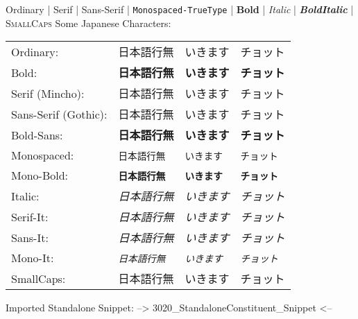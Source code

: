 Ordinary | \textrm{Serif} | \textsf{Sans-Serif} | \texttt{Monospaced-TrueType} | \textbf{Bold} | \textit{Italic} | \textit{\textbf{BoldItalic}} | \textsc{SmallCaps}\nl%
Some Japanese Characters:\nl%
\begin{tabular}{llll}%
Ordinary:&日本語行無&いきます&チョット\\%
Bold:&\textbf{日本語行無}&\textbf{いきます}&\textbf{チョット}\\%
Serif (Mincho):&\textrm{日本語行無}&\textrm{いきます}&\textrm{チョット}\\%
Sans-Serif (Gothic):&\textsf{日本語行無}&\textsf{いきます}&\textsf{チョット}\\%
Bold-Sans:&\textbf{\textsf{日本語行無}}&\textbf{\textsf{いきます}}&\textbf{\textsf{チョット}}\\%
Monospaced:&\texttt{日本語行無}&\texttt{いきます}&\texttt{チョット}\\%
Mono-Bold:&\textbf{\texttt{日本語行無}}&\textbf{\texttt{いきます}}&\textbf{\texttt{チョット}}\\%
\hline%
Italic:&\textit{日本語行無}&\textit{いきます}&\textit{チョット}\\%
Serif-It:&\textit{\textrm{日本語行無}}&\textit{\textrm{いきます}}&\textit{\textrm{チョット}}\\%
Sans-It:&\textit{\textsf{日本語行無}}&\textit{\textsf{いきます}}&\textit{\textsf{チョット}}\\%
Mono-It:&\textit{\texttt{日本語行無}}&\textit{\texttt{いきます}}&\textit{\texttt{チョット}}\\%
\hline%
SmallCaps:&\textsc{日本語行無}&\textsc{いきます}&\textsc{チョット}\\%
\end{tabular}%


\np
Imported Standalone Snippet: -->
{3020_StandaloneConstituent_Snippet}
<--


\npi%
{%
    \Huge%
    \sffamily%
    \textcolor{violet}{%
    }\nl%
    \textcolor{violet}{%
    }%
}%


